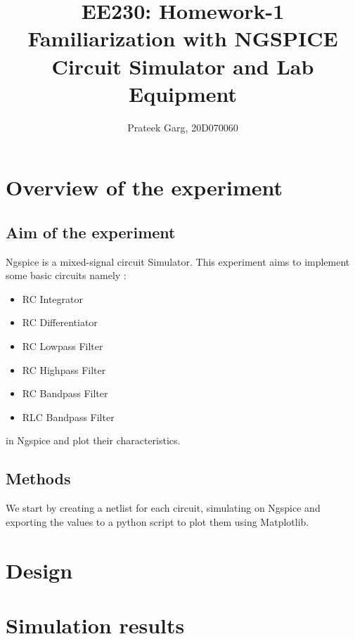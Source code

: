 \documentclass[12pt]{article}
\title{EE230: Homework-1\\
Familiarization with NGSPICE Circuit Simulator and Lab Equipment}
\author{Prateek Garg, 20D070060}
\begin{document}
\noindent
\maketitle

\section{Overview of the experiment} %

\subsection{Aim of the experiment}%

Ngspice is a mixed-signal circuit Simulator. This experiment aims to implement some basic circuits namely :
\begin{itemize}
	\item RC Integrator
	\item RC Differentiator
	\item RC Lowpass Filter
	\item RC Highpass Filter
	\item RC Bandpass Filter
	\item RLC Bandpass Filter
\end{itemize}
in Ngspice and plot their characteristics.

\subsection{Methods}

We start by creating a netlist for each circuit, simulating on Ngspice and exporting the values to a python script to plot them using Matplotlib.
\section{Design}







\section{Simulation results}
\end{document}

